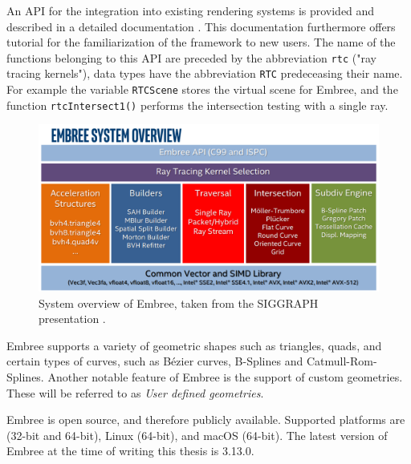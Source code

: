 An API for the integration into existing rendering systems is provided and described in a detailed documentation \cite{embree2021Doc}. This documentation furthermore offers tutorial for the familiarization of the framework to new users. The name of the functions belonging to this API are preceded by the abbreviation \texttt{rtc} ("ray tracing kernels"), data types have the abbreviation \texttt{RTC} predeceasing their name. For example the variable \texttt{RTCScene} stores the virtual scene for Embree, and the function \texttt{rtcIntersect1()} performs the intersection testing with a single ray.

\begin{figure}
	\centering
	\includegraphics[width=1\linewidth]{img/1 fundamentals/embree_overview.png}
	\caption{System overview of Embree, taken from the SIGGRAPH presentation  \cite{embreeSlides}.}
	\label{fig:embree}
\end{figure}

Embree supports a variety of geometric shapes such as triangles, quads, and certain types of curves, such as Bézier curves, B-Splines and Catmull-Rom-Splines.
Another notable feature of Embree is the support of custom geometries. These will be referred to as \emph{User defined geometries}. 

Embree is open source, and therefore publicly available. Supported platforms are (32-bit and 64-bit), Linux (64-bit), and macOS (64-bit). The latest version of Embree at the time of writing this thesis is 3.13.0. 

